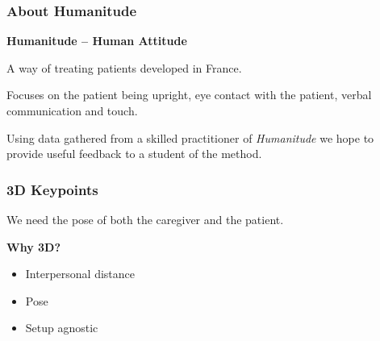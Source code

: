 \documentclass[xcolor=pdftex,dvipsnames,table]{beamer}
\begin{document}
\begin{frame}
  \frametitle{About Humanitude \\ }
  \textbf{Humanitude -- Human Attitude}
  
  A way of treating patients developed in France. \pause

  Focuses on the patient being upright, eye contact with the patient, verbal communication and touch. \pause

  Using data gathered from a skilled practitioner of \emph{Humanitude} we hope to provide useful feedback to a student of the method.
  
\end{frame}

\begin{frame}
  \frametitle{3D Keypoints \\ }

  We need the pose of both the caregiver and the patient. \pause
  \vspace{10pt}
  
  \textbf{Why 3D?} \pause
\begin{itemize}
\item Interpersonal distance \pause
\item Pose \pause
\item  Setup agnostic 
  \end{itemize}
  
\end{frame}
\end{document}
